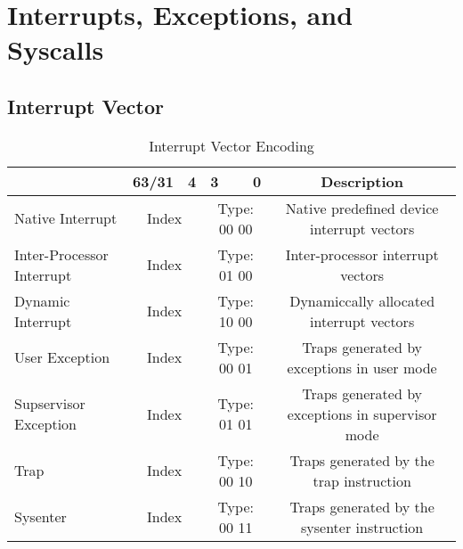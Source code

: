\documentclass{article}
\begin{document}
    \newpage

\section{Interrupts, Exceptions, and Syscalls}

    \subsection{Interrupt Vector}
    
    \begin{table}[H]
    \centering
    \caption{Interrupt Vector Encoding}
    \label{table:int_vec}
    \begin{tabular}{|l|l|r|l|r|c|}
    
    \hline                          &   \multicolumn{1}{|l}{63/31}  &   4   &   \multicolumn{1}{|l}{3}  &   0       &   Description \\
    \hline Native Interrupt         &   \multicolumn{2}{|c|}{Index}         &   \multicolumn{2}{|c|}{Type: 00 00}       &   Native predefined device interrupt vectors  \\
    \hline Inter-Processor Interrupt    &   \multicolumn{2}{|c|}{Index}         &   \multicolumn{2}{|c|}{Type: 01 00}       &   Inter-processor interrupt vectors   \\  
    \hline Dynamic Interrupt            &   \multicolumn{2}{|c|}{Index}         &   \multicolumn{2}{|c|}{Type: 10 00}       &   Dynamiccally allocated interrupt vectors    \\
    \hline User Exception           &   \multicolumn{2}{|c|}{Index}         &   \multicolumn{2}{|c|}{Type: 00 01}       &   Traps generated by exceptions in user mode  \\
    \hline Supservisor Exception        &   \multicolumn{2}{|c|}{Index}         &   \multicolumn{2}{|c|}{Type: 01 01}       &   Traps generated by exceptions    in supervisor mode \\
    \hline Trap                     &   \multicolumn{2}{|c|}{Index}         &   \multicolumn{2}{|c|}{Type: 00 10}       &   Traps generated by the trap instruction \\
    \hline Sysenter                 &   \multicolumn{2}{|c|}{Index}         &   \multicolumn{2}{|c|}{Type: 00 11}       &   Traps generated by the sysenter instruction \\
    
    \hline
    \end{tabular}
    \end{table}
\end{document}
